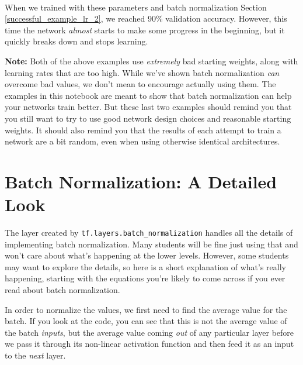 \documentclass[11pt]{article}
\begin{document}
    \begin{center}
    \end{center}
    { \hspace*{\fill} \\}
    
    When we trained with these parameters and batch normalization
Section \ref{successful_example_lr_2}, we reached 90\% validation
accuracy. However, this time the network \emph{almost} starts to make
some progress in the beginning, but it quickly breaks down and stops
learning.

\textbf{Note:} Both of the above examples use \emph{extremely} bad
starting weights, along with learning rates that are too high. While
we've shown batch normalization \emph{can} overcome bad values, we don't
mean to encourage actually using them. The examples in this notebook are
meant to show that batch normalization can help your networks train
better. But these last two examples should remind you that you still
want to try to use good network design choices and reasonable starting
weights. It should also remind you that the results of each attempt to
train a network are a bit random, even when using otherwise identical
architectures.

    \hypertarget{batch-normalization-a-detailed-look}{%
\section{Batch Normalization: A Detailed
Look}\label{batch-normalization-a-detailed-look}}

    The layer created by \texttt{tf.layers.batch\_normalization} handles all
the details of implementing batch normalization. Many students will be
fine just using that and won't care about what's happening at the lower
levels. However, some students may want to explore the details, so here
is a short explanation of what's really happening, starting with the
equations you're likely to come across if you ever read about batch
normalization.

    In order to normalize the values, we first need to find the average
value for the batch. If you look at the code, you can see that this is
not the average value of the batch \emph{inputs}, but the average value
coming \emph{out} of any particular layer before we pass it through its
non-linear activation function and then feed it as an input to the
\emph{next} layer.
\end{document}
